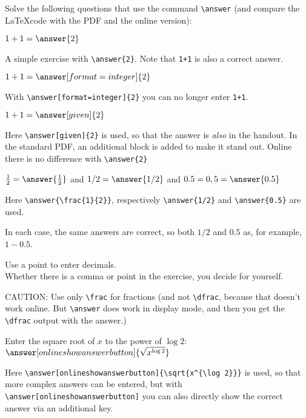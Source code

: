 \documentclass{ximera}
\begin{document}
\begin{exercise}    
    Solve the following questions that use the command \verb|\answer| (and compare the \LaTeX code with the PDF and the online version):
	\begin{question}\label{itm:showCase:eerste_oefening}
        $1+1 = \answer{2}$

        A simple exercise with \verb|\answer{2}|. Note that \verb|1+1| is also a correct answer.
    \end{question}
	\begin{question}\label{itm:showCase:eerste_oefening}
        $1+1 = \answer[format=integer]{2}$

        With \verb|\answer[format=integer]{2}| you can no longer enter \verb|1+1|.    %
    \end{question}
    \begin{question}
        $1+1 = \answer[given]{2}$ 

        Here \verb|\answer[given]{2}| is used, so that the answer is \textit{also} in the handout. 
        In the standard PDF, an additional block is added to make it stand out.
        Online there is no difference with \verb|\answer{2}|
    \end{question}
    \begin{question}
         $\frac{1}{2} =  \answer{\frac{1}{2}}$  and $1/2=\answer{1/2}$ and $0.5 = 0,5 =\answer{0.5}$

         Here \verb|\answer{\frac{1}{2}}|,  respectively \verb|\answer{1/2}| and \verb|\answer{0.5}| are used.

         In each case, the same answers are correct, so both $1/2$ and $0.5$ as, for example, $1-0.5$.

         Use a point to enter decimals. 
         \\
         Whether there is a comma or point in the exercise, you decide for yourself.

         CAUTION: Use only \verb|\frac| for fractions (and not \verb|\dfrac|, because that doesn't work online. But \verb|\answer| does work in display mode, and then you get the \verb|\dfrac| output with the answer.) 
    \end{question}

    \begin{question}

    Enter the square root of $x$ to the power of $\log 2$:   $\answer[onlineshowanswerbutton]{\sqrt{x^{\log 2}}}$

       Here \verb|\answer[onlineshowanswerbutton]{\sqrt{x^{\log 2}}}| is used, so that more complex answers can be entered, but with \verb|\answer[onlineshowanswerbutton]| you can also directly show the correct answer via an additional key. 


\end{question}
\end{exercise}
\end{document}
